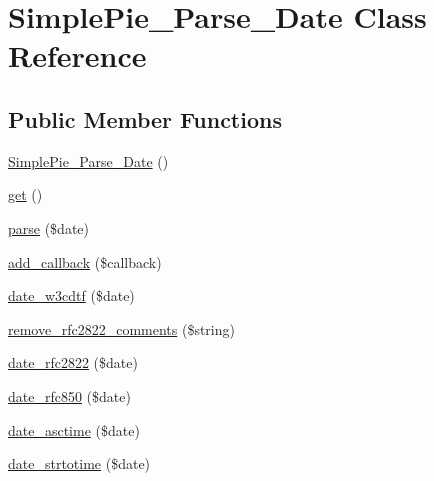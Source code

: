 \hypertarget{class_simple_pie___parse___date}{\section{Simple\-Pie\-\_\-\-Parse\-\_\-\-Date Class Reference}
\label{class_simple_pie___parse___date}
}
\subsection*{Public Member Functions}
\begin{DoxyCompactItemize}
\item 
\hyperlink{class_simple_pie___parse___date_a36b5662b5a7f29fe8c9b05f5754e9bf1}{Simple\-Pie\-\_\-\-Parse\-\_\-\-Date} ()
\item 
\hyperlink{class_simple_pie___parse___date_a091747b2048b1e39fbebe83e4f88baf3}{get} ()
\item 
\hyperlink{class_simple_pie___parse___date_a0fb011be0e4ba926df32b0d012180e46}{parse} (\$date)
\item 
\hyperlink{class_simple_pie___parse___date_a8f82a90605e4e49e35299c0207991bb2}{add\-\_\-callback} (\$callback)
\item 
\hyperlink{class_simple_pie___parse___date_a4dcfd8c357675d90cddf7ece9ce23967}{date\-\_\-w3cdtf} (\$date)
\item 
\hyperlink{class_simple_pie___parse___date_a8c81c6d8f88980f6ad55f960995d2a7d}{remove\-\_\-rfc2822\-\_\-comments} (\$string)
\item 
\hyperlink{class_simple_pie___parse___date_a75890a7edfcb5555cd5b275f635ae5fa}{date\-\_\-rfc2822} (\$date)
\item 
\hyperlink{class_simple_pie___parse___date_aaa458b861088fc3f0f8b25ea611126dc}{date\-\_\-rfc850} (\$date)
\item 
\hyperlink{class_simple_pie___parse___date_a623391b500ff0967d3d9b6532c864074}{date\-\_\-asctime} (\$date)
\item 
\hyperlink{class_simple_pie___parse___date_a794d8e4b06512f9bab7186174058e154}{date\-\_\-strtotime} (\$date)
\end{DoxyCompactItemize}
